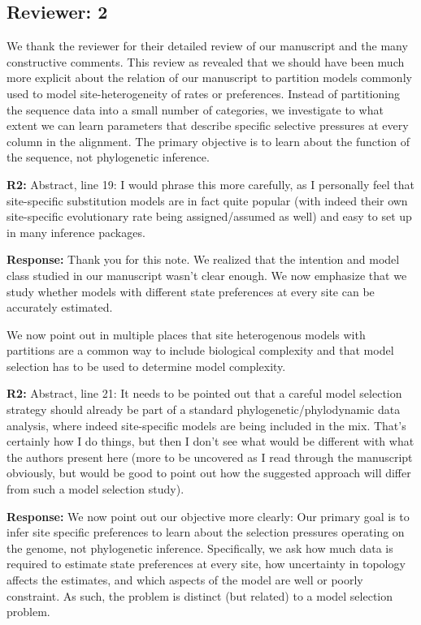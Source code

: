 \documentclass[aps,rmp,onecolumn]{revtex4-1}
\newcommand{\refb}[1]{\textbf{R2:} #1}
\newcommand{\response}[1]{{\color{black}\textbf{Response:} #1}}
\begin{document}
\subsection*{Reviewer: 2}

We thank the reviewer for their detailed review of our manuscript and the many constructive comments.
This review as revealed that we should have been much more explicit about the relation of our manuscript to partition models commonly used to model site-heterogeneity of rates or preferences.
Instead of partitioning the sequence data into a small number of categories, we investigate to what extent we can learn parameters that describe specific selective pressures at every column in the alignment.
The primary objective is to learn about the function of the sequence, not phylogenetic inference.


\refb{Abstract, line 19: I would phrase this more carefully, as I personally feel that site-specific substitution models are in fact quite popular (with indeed their own site-specific evolutionary rate being assigned/assumed as well) and easy to set up in many inference packages.}

\response{Thank you for this note. We realized that the intention and model class studied in our manuscript wasn't clear enough. We now emphasize that we study whether models with different state preferences at every site can be accurately estimated.

We now point out in multiple places that site heterogenous models with partitions are a common way to include biological complexity and that model selection has to be used to determine model complexity.
}

\refb{Abstract, line 21: It needs to be pointed out that a careful model selection strategy should already be part of a standard phylogenetic/phylodynamic data analysis, where indeed site-specific models are being included in the mix. That’s certainly how I do things, but then I don’t see what would be different with what the authors present here (more to be uncovered as I read through the manuscript obviously, but would be good to point out how the suggested approach will differ from such a model selection study).}

\response{
We now point out our objective more clearly: Our primary goal is to infer site specific preferences to learn about the selection pressures operating on the genome, not phylogenetic inference.
Specifically, we ask how much data is required to estimate state preferences at every site, how uncertainty in topology affects the estimates, and which aspects of the model are well or poorly constraint.
As such, the problem is distinct (but related) to a model selection problem.
}
\end{document}
